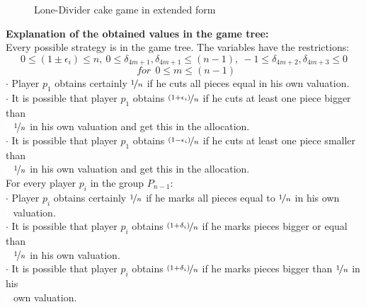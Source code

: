 \begin{figure}[h!]
\begin{center}
	\caption{Lone-Divider cake game in extended form}
\end{center}
\end{figure}
\newline
\textbf{Explanation of the obtained values in the game tree:}\\
\newline
Every possible strategy is in the game tree. The variables have the restrictions: $$0 \leq (1\pm\epsilon_i)\leq n,\:0 \leq \delta_{4m+1},\delta_{4m+1} \leq (n-1),\:-1 \leq \delta_{4m+2},\delta_{4m+3} \leq 0$$$$\:\:for\:\:0 \leq m \leq (n-1) $$
$\cdot$ Player $p_1$ obtains certainly $\nicefrac{1}{n}$ if he cuts all pieces equal in his own valuation.\\
$\cdot$ It is possible that player $p_1$ obtains $\nicefrac{(1+\epsilon_i)}{n}$ if he cuts at least one piece bigger than\\\textcolor{white}{la}\textcolor{black}{}$\nicefrac{1}{n}$ in his own valuation and get this in the allocation.\\
$\cdot$ It is possible that player $p_1$ obtains $\nicefrac{(1-\epsilon_i)}{n}$ if he cuts at least one piece smaller than\\\textcolor{white}{la}\textcolor{black}{}$\nicefrac{1}{n}$ in his own valuation and get this in the allocation.\\
\newline
For every player $p_i$ in the group $P_{n-1}$:\\
\newline
$\cdot$ Player $p_i$ obtains certainly $\nicefrac{1}{n}$ if he marks all pieces equal to $\nicefrac{1}{n}$ in his own\\\textcolor{white}{la}\textcolor{black}{}valuation.\\
$\cdot$ It is possible that player $p_i$ obtains $\nicefrac{(1+\delta_i)}{n}$ if he marks pieces bigger or equal than\\\textcolor{white}{la}\textcolor{black}{}$\nicefrac{1}{n}$ in his own valuation.\\
$\cdot$ It is possible that player $p_i$ obtains $\nicefrac{(1+\delta_i)}{n}$ if he marks pieces bigger than $\nicefrac{1}{n}$ in his\\\textcolor{white}{la}\textcolor{black}{}own valuation.\\
